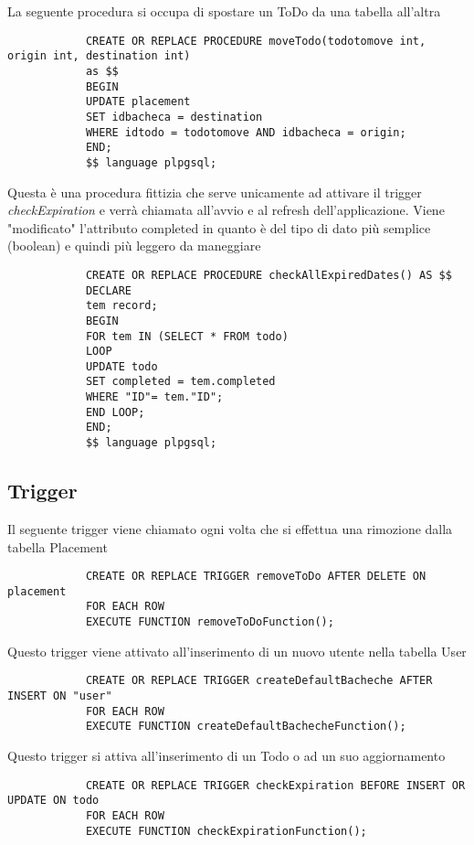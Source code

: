 \documentclass{article}
\begin{document}
		La seguente procedura si occupa di spostare un ToDo da una tabella all'altra
			\begin{lstlisting}
			CREATE OR REPLACE PROCEDURE moveTodo(todotomove int, origin int, destination int) 
			as $$
			BEGIN
			UPDATE placement
			SET idbacheca = destination
			WHERE idtodo = todotomove AND idbacheca = origin;
			END;
			$$ language plpgsql;
		\end{lstlisting}
		\hfill \linebreak[2]
		
		Questa è una procedura fittizia che serve unicamente ad attivare il trigger \textit{checkExpiration} e verrà chiamata all'avvio e al refresh dell'applicazione. Viene "modificato" l'attributo completed in quanto è del tipo di dato più semplice (boolean) e quindi più leggero da maneggiare
			\begin{lstlisting}
			CREATE OR REPLACE PROCEDURE checkAllExpiredDates() AS $$
			DECLARE
			tem record;
			BEGIN
			FOR tem IN (SELECT * FROM todo)
			LOOP
			UPDATE todo 
			SET completed = tem.completed
			WHERE "ID"= tem."ID";
			END LOOP;
			END;
			$$ language plpgsql;
		\end{lstlisting}
		
		\subsection{Trigger}
		
		Il seguente trigger viene chiamato ogni volta che si effettua una rimozione dalla tabella Placement
			\begin{lstlisting}
			CREATE OR REPLACE TRIGGER removeToDo AFTER DELETE ON placement
			FOR EACH ROW
			EXECUTE FUNCTION removeToDoFunction();
		\end{lstlisting}
		\hfill \linebreak[2]
		
		Questo trigger viene attivato all'inserimento di un nuovo utente nella tabella User
			\begin{lstlisting}
			CREATE OR REPLACE TRIGGER createDefaultBacheche AFTER INSERT ON "user"
			FOR EACH ROW
			EXECUTE FUNCTION createDefaultBachecheFunction();
		\end{lstlisting}
		\hfill \linebreak[2]
		
		Questo trigger si attiva all'inserimento di un Todo o ad un suo aggiornamento
			\begin{lstlisting}
			CREATE OR REPLACE TRIGGER checkExpiration BEFORE INSERT OR UPDATE ON todo
			FOR EACH ROW
			EXECUTE FUNCTION checkExpirationFunction();
		\end{lstlisting}
		
\end{document}
